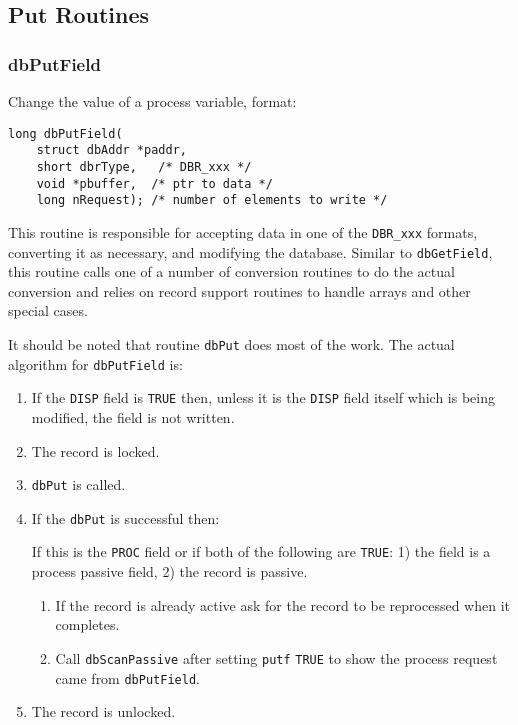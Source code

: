 \subsection{Put Routines}

\subsubsection{dbPutField}

Change the value of a process variable, format:

\begin{verbatim}
long dbPutField(
    struct dbAddr *paddr,
    short dbrType,   /* DBR_xxx */
    void *pbuffer,  /* ptr to data */
    long nRequest); /* number of elements to write */
\end{verbatim}

This routine is responsible for accepting data in one of the \verb|DBR_xxx| formats, converting it as necessary, and modifying 
the database. Similar to \verb|dbGetField|, this routine calls one of a number of conversion routines to do the actual 
conversion and relies on record support routines to handle arrays and other special cases.

It should be noted that routine \verb|dbPut| does most of the work. The actual algorithm for \verb|dbPutField| is:

\begin{enumerate}
\item If the \verb|DISP| field is \verb|TRUE| then, unless it is the \verb|DISP| field itself which is being modified, the field is not written.

\item The record is locked.

\item \verb|dbPut| is called.

\item If the \verb|dbPut| is successful then:

If this is the \verb|PROC| field or if both of the following are \verb|TRUE|: 1) the field is a process passive field, 2) the record is 
passive.

\begin{enumerate}

\item If the record is already active ask for the record to be reprocessed when it completes.

\item Call \verb|dbScanPassive| after setting \verb|putf| \verb|TRUE| to show the process request came from \verb|dbPutField|.

\end{enumerate}

\item The record is unlocked.

\end{enumerate}


